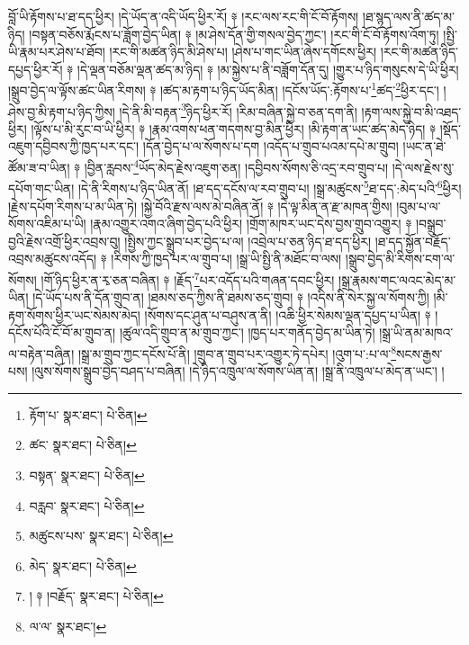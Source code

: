 བློ་ཡི་རྟོགས་པ་ཐ་དད་ཕྱིར། །དེ་ཡོད་ན་འདི་ཡོད་ཕྱིར་རོ། ༈ །རང་ལས་རང་གི་ངོ་བོ་རྟོགས། །ཐ་སྙད་ལས་ནི་ཚད་མ་ཉིད། །བསྟན་བཅོས་རྨོངས་པ་ཟློག་བྱེད་ཡིན། ༈ །མ་ཤེས་དོན་གྱི་གསལ་བྱེད་ཀྱང་། །རང་གི་ངོ་བོ་རྟོགས་འོག་ཏུ། །སྤྱི་ཡི་རྣམ་པར་ཤེས་པ་ཐོབ། །རང་གི་མཚན་ཉིད་མི་ཤེས་པ། །ཤེས་པ་གང་ཡིན་ཞེས་དགོངས་ཕྱིར། །རང་གི་མཚན་ཉིད་དཔྱད་ཕྱིར་རོ། ༈ །དེ་ལྡན་བཅོམ་ལྡན་ཚད་མ་ཉིད། ༈ །མ་སྐྱེས་པ་ནི་བཟློག་དོན་དུ། །གྱུར་པ་ཉིད་གསུངས་དེ་ཡི་ཕྱིར། །སྒྲུབ་བྱེད་ལ་ལྟོས་ཚང་ཡིན་རིགས། ༈ །ཚད་མ་རྟག་པ་ཉིད་ཡོད་མིན། །དངོས་ཡོད་:རྟོགས་པ་\footnote{རྟོག་པ་  སྣར་ཐང་།  པེ་ཅིན། }ཚད་\footnote{ཚང་  སྣར་ཐང་།  པེ་ཅིན། }ཕྱིར་དང་། །ཤེས་བྱ་མི་རྟག་པ་ཉིད་ཀྱིས། །དེ་ནི་མི་བརྟན་\footnote{བསྟན་  སྣར་ཐང་།  པེ་ཅིན། }ཉིད་ཕྱིར་རོ། །རིམ་བཞིན་སྐྱེ་བ་ཅན་དག་ནི། །རྟག་ལས་སྐྱེ་བ་མི་འཐད་ཕྱིར། །ལྟོས་པ་མི་རུང་བ་ཡི་ཕྱིར། ༈ །རྣམ་འགས་ཕན་གདགས་བྱ་མིན་ཕྱིར། །མི་རྟག་ན་ཡང་ཚད་མེད་ཉིད། ༈ །སྡོད་འཇུག་དབྱིབས་ཀྱི་ཁྱད་པར་དང་། །དོན་བྱེད་པ་ལ་སོགས་པ་དག །འདོད་པ་གྲུབ་པའམ་དཔེ་མ་གྲུབ། །ཡང་ན་ཐེ་ཚོམ་ཟ་བ་ཡིན། ༈ །བྱིན་རླབས་\footnote{བརླབ་  སྣར་ཐང་།  པེ་ཅིན། }ཡོད་མེད་རྗེས་འཇུག་ཅན། །དབྱིབས་སོགས་ཅི་འདྲ་རབ་གྲུབ་པ། །དེ་ལས་རྗེས་སུ་དཔོག་གང་ཡིན། །དེ་ནི་རིགས་པ་ཉིད་ཡིན་ནོ། །ཐ་དད་དངོས་ལ་རབ་གྲུབ་པ། །སྒྲ་མཚུངས་\footnote{མཚུངས་པས་  སྣར་ཐང་།  པེ་ཅིན། }ཐ་དད་:མེད་པའི་\footnote{མེད་  སྣར་ཐང་།  པེ་ཅིན། }ཕྱིར། །རྗེས་དཔོག་རིགས་པ་མ་ཡིན་ཏེ། །སྐྱེ་བོའི་རྫས་ལས་མེ་བཞིན་ནོ། ༈ །དེ་ལྟ་མིན་ན་རྫ་མཁན་གྱིས། །བུམ་པ་ལ་སོགས་འཇིམ་པ་ཡི། །རྣམ་འགྱུར་འགའ་ཞིག་བྱེད་པའི་ཕྱིར། །གྲོག་མཁར་ཡང་དེས་བྱས་གྲུབ་འགྱུར། ༈ །བསྒྲུབ་བྱའི་རྗེས་འགྲོ་ཕྱིར་འབྲས་བུ། །སྤྱིས་ཀྱང་སྒྲུབ་པར་བྱེད་པ་ལ། །འབྲེལ་པ་ཅན་ཉིད་ཐ་དད་ཕྱིར། །ཐ་དད་སྐྱོན་བརྗོད་འབྲས་མཚུངས་འདོད། ༈ །རིགས་ཀྱི་ཁྱད་པར་ལ་གྲུབ་པ། །སྒྲ་ཡི་སྤྱི་ནི་མཐོང་བ་ལས། །སྒྲུབ་བྱེད་མི་རིགས་ངག་ལ་སོགས། །གོ་ཉིད་ཕྱིར་ན་རྭ་ཅན་བཞིན། ༈ །རྗོད་\footnote{། ༈ །བརྗོད་  སྣར་ཐང་།  པེ་ཅིན། }པར་འདོད་པའི་གཞན་དབང་ཕྱིར། །སྒྲ་རྣམས་གང་ལའང་མེད་མ་ཡིན། །དེ་ཡོད་པས་ནི་དོན་གྲུབ་ན། །ཐམས་ཅད་ཀྱིས་ནི་ཐམས་ཅད་གྲུབ། ༈ །འདིས་ནི་སེར་སྐྱ་ལ་སོགས་ཀྱི། །མི་རྟག་སོགས་ཕྱིར་ཡང་སེམས་མེད། །སོགས་དང་ཤུན་པ་བཤུས་ན་ནི། །འཆི་ཕྱིར་སེམས་ལྡན་དཔྱད་པ་ཡིན། ༈ །དངོས་པོའི་ངོ་བོ་མ་གྲུབ་ན། །ཚུལ་འདི་གྲུབ་ན་མ་གྲུབ་ཀྱང་། །ཁྱད་པར་གནོད་བྱེད་མ་ཡིན་ཏེ། །སྒྲ་ཡི་ནམ་མཁའ་ལ་བརྟེན་བཞིན། །སྒྲ་མ་གྲུབ་ཀྱང་དངོས་པོ་ནི། །གྲུབ་ན་གྲུབ་པར་འགྱུར་ཏེ་དཔེར། །འུག་པ་:པ་ལ་\footnote{ལ་ལ་  སྣར་ཐང་། }སངས་རྒྱས་པས། །ལུས་སོགས་སྒྲུབ་བྱེད་བཤད་པ་བཞིན། །དེ་ཉིད་འཁྲུལ་ལ་སོགས་ཡིན་ན། །སྒྲ་ནི་འཁྲུལ་པ་མེད་ན་ཡང་། །
